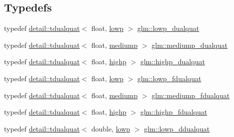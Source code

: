 \subsection*{Typedefs}
\begin{DoxyCompactItemize}
\item 
typedef \hyperlink{structglm_1_1detail_1_1tdualquat}{detail\+::tdualquat}$<$ float, \hyperlink{namespaceglm_a0f04f086094c747d227af4425893f545ae161af3fc695e696ce3bf69f7332bc2d}{lowp} $>$ \hyperlink{group__gtc__dual__quaternion_gae1772179edc60f4e8b46c8772eeeccee}{glm\+::lowp\+\_\+dualquat}
\item 
typedef \hyperlink{structglm_1_1detail_1_1tdualquat}{detail\+::tdualquat}$<$ float, \hyperlink{namespaceglm_a0f04f086094c747d227af4425893f545a6416f3ea0c9025fb21ed50c4d6620482}{mediump} $>$ \hyperlink{group__gtc__dual__quaternion_ga71fc1c10a382330c1fee55ce29703405}{glm\+::mediump\+\_\+dualquat}
\item 
typedef \hyperlink{structglm_1_1detail_1_1tdualquat}{detail\+::tdualquat}$<$ float, \hyperlink{namespaceglm_a0f04f086094c747d227af4425893f545ac6f7eab42eacbb10d59a58e95e362074}{highp} $>$ \hyperlink{group__gtc__dual__quaternion_gaf3a01deb502f53ca555ee1d45e6d6776}{glm\+::highp\+\_\+dualquat}
\item 
typedef \hyperlink{structglm_1_1detail_1_1tdualquat}{detail\+::tdualquat}$<$ float, \hyperlink{namespaceglm_a0f04f086094c747d227af4425893f545ae161af3fc695e696ce3bf69f7332bc2d}{lowp} $>$ \hyperlink{group__gtc__dual__quaternion_gae62c636c63c9eb3c1ea6d10f4b7d7c81}{glm\+::lowp\+\_\+fdualquat}
\item 
typedef \hyperlink{structglm_1_1detail_1_1tdualquat}{detail\+::tdualquat}$<$ float, \hyperlink{namespaceglm_a0f04f086094c747d227af4425893f545a6416f3ea0c9025fb21ed50c4d6620482}{mediump} $>$ \hyperlink{group__gtc__dual__quaternion_gab211d24786158490e57dfa57d7744f71}{glm\+::mediump\+\_\+fdualquat}
\item 
typedef \hyperlink{structglm_1_1detail_1_1tdualquat}{detail\+::tdualquat}$<$ float, \hyperlink{namespaceglm_a0f04f086094c747d227af4425893f545ac6f7eab42eacbb10d59a58e95e362074}{highp} $>$ \hyperlink{group__gtc__dual__quaternion_ga2ed3283c09d3ffaf52a0e0a4b248eab6}{glm\+::highp\+\_\+fdualquat}
\item 
typedef \hyperlink{structglm_1_1detail_1_1tdualquat}{detail\+::tdualquat}$<$ double, \hyperlink{namespaceglm_a0f04f086094c747d227af4425893f545ae161af3fc695e696ce3bf69f7332bc2d}{lowp} $>$ \hyperlink{group__gtc__dual__quaternion_ga29461fddd543ffdf65a199fc28c42458}{glm\+::lowp\+\_\+ddualquat}

\end{DoxyCompactItemize}
